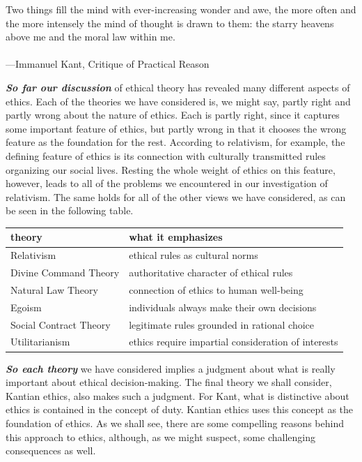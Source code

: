 \documentclass[12pt, openany]{book}
\newenvironment{epigraph}%
{
\begin{flushright}
\begin{minipage}{30em}
\begin{flushright}
\itshape
}%
{
\end{flushright}
\end{minipage}
\end{flushright}
\vspace{1em}
}
\begin{document}
\begin{epigraph}

Two things fill the mind with ever-increasing wonder and awe, the more often and the more intensely the mind of thought is drawn to them: the starry heavens above me and the moral law within me.\\
~\\
---Immanuel Kant, Critique of Practical Reason

\end{epigraph}

\textbf{\emph{So far our discussion}} of ethical theory has revealed many different aspects of ethics. Each of the theories we have considered is, we might say, partly right and partly wrong about the nature of ethics. Each is partly right, since it captures some important feature of ethics, but partly wrong in that it chooses the wrong feature as the foundation for the rest. According to relativism, for example, the defining feature of ethics is its connection with culturally transmitted rules organizing our social lives. Resting the whole weight of ethics on this feature, however, leads to all of the problems we encountered in our investigation of relativism. The same holds for all of the other views we have considered, as can be seen in the following table.

\begin{longtable}[]{@{}ll@{}}
\toprule
theory & what it emphasizes\tabularnewline
\midrule
\endhead
Relativism & ethical rules as cultural norms\tabularnewline
Divine Command Theory & authoritative character of ethical rules\tabularnewline
Natural Law Theory & connection of ethics to human well-being\tabularnewline
Egoism & individuals always make their own decisions\tabularnewline
Social Contract Theory & legitimate rules grounded in rational choice\tabularnewline
Utilitarianism & ethics require impartial consideration of interests\tabularnewline
\bottomrule
\end{longtable}

\textbf{\emph{So each theory}} we have considered implies a judgment about what is really important about ethical decision-making. The final theory we shall consider, Kantian ethics, also makes such a judgment. For Kant, what is distinctive about ethics is contained in the concept of duty. Kantian ethics uses this concept as the foundation of ethics. As we shall see, there are some compelling reasons behind this approach to ethics, although, as we might suspect, some challenging consequences as well.
\end{document}
